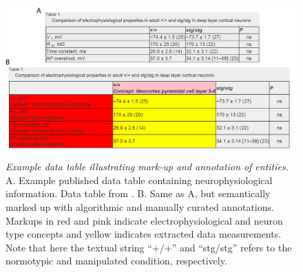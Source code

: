 \documentclass{template/frontiersSCNS} %
\begin{document}
\begin{figure}
\centering
\includegraphics[scale = 1]{figures/example_data_table_v2.jpg}
\caption{\textit{Example data table illustrating mark-up and annotation of entities.}  
A. Example published data table containing neurophysiological information.  Data table from \citet{pasquale_increased_1997}.  
B. Same as A, but semantically marked up with algorithmic and manually curated annotations.  
Markups in red and pink indicate electrophysiological and neuron type concepts and yellow indicates extracted data measurements.  
Note that here the textual string ``+/+'' and ``stg/stg'' refers to the normotypic and manipulated condition, respectively.}
\label{data_table}
\end{figure}
\end{document}
